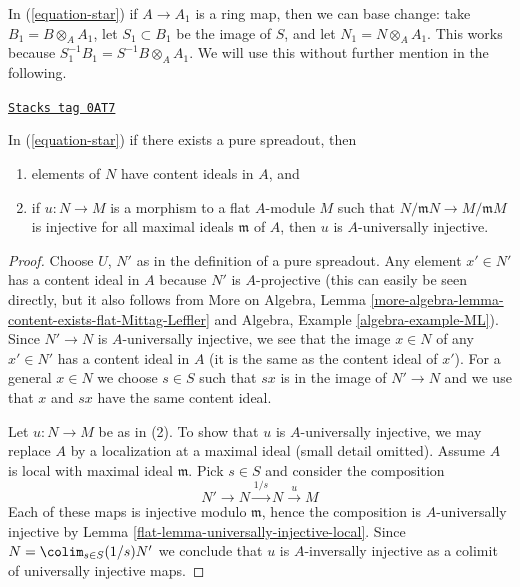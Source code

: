 \medskip\noindent
In (\ref{equation-star}) if $A \to A_1$ is a ring map, then we
can base change: take $B_1 = B \otimes_A A_1$, let $S_1 \subset B_1$
be the image of $S$, and let $N_1 = N \otimes_A A_1$. This works
because $S_1^{-1}B_1 = S^{-1}B \otimes_A A_1$. We will use this
without further mention in the following.

\begin{lemma}
\label{flat-lemma-properties-pure-spreadout}
\href{https://stacks.math.columbia.edu/tag/0AT7}{\texttt{Stacks tag 0AT7}}

In (\ref{equation-star}) if there exists a pure spreadout, then
\begin{enumerate}
\item elements of $N$ have content ideals in $A$, and
\item if $u : N \to M$ is a morphism to a flat $A$-module $M$
such that $N/\mathfrak m N \to M/\mathfrak m M$ is injective
for all maximal ideals $\mathfrak m$ of $A$, then $u$ is
$A$-universally injective.
\end{enumerate}
\end{lemma}

\begin{proof}

Choose $U$, $N'$ as in the definition of a pure spreadout.
Any element $x' \in N'$ has a content ideal in $A$ because
$N'$ is $A$-projective (this can easily be seen directly, but
it also follows from More on Algebra, Lemma
\ref{more-algebra-lemma-content-exists-flat-Mittag-Leffler} and
Algebra, Example \ref{algebra-example-ML}).
Since $N' \to N$ is $A$-universally injective, we see that
the image $x \in N$ of any $x' \in N'$ has a content ideal in $A$
(it is the same as the content ideal of $x'$).
For a general $x \in N$ we choose $s \in S$ such that
$s x$ is in the image of $N' \to N$ and we use that $x$ and $sx$
have the same content ideal.

\medskip\noindent
Let $u : N \to M$ be as in (2). To show that $u$ is $A$-universally
injective, we may replace $A$ by a localization at a maximal ideal
(small detail omitted). Assume $A$ is local with maximal ideal $\mathfrak m$.
Pick $s \in S$ and consider the composition
$$
N' \to N \xrightarrow{1/s} N \xrightarrow{u} M
$$
Each of these maps is injective modulo $\mathfrak m$, hence the composition
is $A$-universally injective by
Lemma \ref{flat-lemma-universally-injective-local}.
Since $N = \colim_{s \in S} (1/s)N'$ we conclude that $u$
is $A$-inversally injective as a colimit of universally injective maps.
\end{proof}

